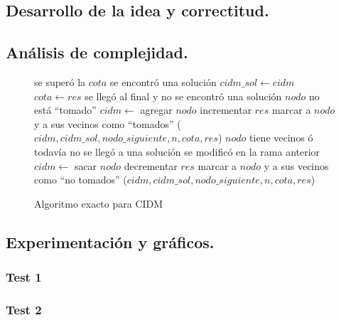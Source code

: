 \subsection{Desarrollo de la idea y correctitud.}

\vspace*{0.3cm}


 
\vspace*{0.6cm}


\subsection{Análisis de complejidad.}

\vspace*{0.3cm}

\begin{figure}
\begin{codebox}
\li \If se superó la $cota$
\li \Then \Return
	\End
\li \If se encontró una solución
\li \Then 
 		$cidm\_sol \leftarrow cidm$
\li 		$cota \leftarrow res$
\li 		\Return
	\End
\li \If se llegó al final y no se encontró una solución
\li \Then \Return
	\End
\li \If $nodo$ no está ``tomado''	
\li \Then
		$cidm \leftarrow$ agregar $nodo$
\li 		incrementar $res$
\li 		marcar a $nodo$ y a sus vecinos como ``tomados''
($cidm,cidm\_sol,nodo\_siguiente,n,cota,res$)
	\End
\li \If $nodo$ tiene vecinos ó todavía no se llegó a una solución
\li \Then
 		\If se modificó en la rama anterior
\li 		\Then
			$cidm \leftarrow$ sacar $nodo$
\li			decrementar $res$
\li 			marcar a $nodo$ y a sus vecinos como ``no tomados''
		\End
{}($cidm,cidm\_sol,nodo\_siguiente,n,cota,res$)
\end{codebox}
\caption{Algoritmo exacto para CIDM}\label{code:exacto}
\end{figure}


\vspace*{0.6cm}
\subsection{Experimentación y gráficos.}

\vspace*{0.3cm}


\subsubsection{Test 1}
\vspace*{0.3cm}

\vspace*{0.6cm}

\subsubsection{Test 2}

